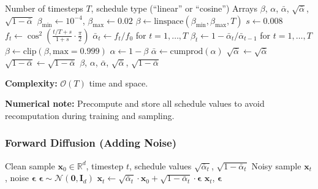 \begin{algorithm}[H]
\caption{Compute Noise Schedule}
\label{alg:noise_schedule}
\begin{algorithmic}[1]
\REQUIRE Number of timesteps $T$, schedule type (``linear'' or ``cosine'')
\ENSURE Arrays $\beta$, $\alpha$, $\bar{\alpha}$, $\sqrt{\bar{\alpha}}$, $\sqrt{1-\bar{\alpha}}$
    \STATE $\beta_{\min} \gets 10^{-4}$, $\beta_{\max} \gets 0.02$
    \STATE $\beta \gets \text{linspace}(\beta_{\min}, \beta_{\max}, T)$
    \STATE $s \gets 0.008$ 
        \STATE $f_t \gets \cos^2\left(\frac{t/T + s}{1+s} \cdot \frac{\pi}{2}\right)$
    \ENDFOR
    \STATE $\bar{\alpha}_t \gets f_t / f_0$ for $t = 1, \ldots, T$
    \STATE $\beta_t \gets 1 - \bar{\alpha}_t / \bar{\alpha}_{t-1}$ for $t = 1, \ldots, T$
    \STATE $\beta \gets \text{clip}(\beta, \text{max}=0.999)$
\ENDIF
\STATE $\alpha \gets 1 - \beta$
\STATE $\bar{\alpha} \gets \text{cumprod}(\alpha)$
\STATE $\sqrt{\bar{\alpha}} \gets \sqrt{\bar{\alpha}}$
\STATE $\sqrt{1-\bar{\alpha}} \gets \sqrt{1 - \bar{\alpha}}$
\RETURN $\beta$, $\alpha$, $\bar{\alpha}$, $\sqrt{\bar{\alpha}}$, $\sqrt{1-\bar{\alpha}}$
\end{algorithmic}
\end{algorithm}

\textbf{Complexity:} $\mathcal{O}(T)$ time and space.

\textbf{Numerical note:} Precompute and store all schedule values to avoid recomputation during training and sampling.

\subsubsection{Forward Diffusion (Adding Noise)}

\begin{algorithm}[H]
\caption{Forward Diffusion: Sample $\mathbf{x}_t$ from $\mathbf{x}_0$}
\label{alg:forward_diffusion}
\begin{algorithmic}[1]
\REQUIRE Clean sample $\mathbf{x}_0 \in \mathbb{R}^d$, timestep $t$, schedule values $\sqrt{\bar{\alpha}_t}$, $\sqrt{1-\bar{\alpha}_t}$
\ENSURE Noisy sample $\mathbf{x}_t$, noise $\boldsymbol{\epsilon}$
\STATE $\boldsymbol{\epsilon} \sim \mathcal{N}(\mathbf{0}, \mathbf{I}_d)$
\STATE $\mathbf{x}_t \gets \sqrt{\bar{\alpha}_t} \cdot \mathbf{x}_0 + \sqrt{1-\bar{\alpha}_t} \cdot \boldsymbol{\epsilon}$
\RETURN $\mathbf{x}_t$, $\boldsymbol{\epsilon}$
\end{algorithmic}
\end{algorithm}

